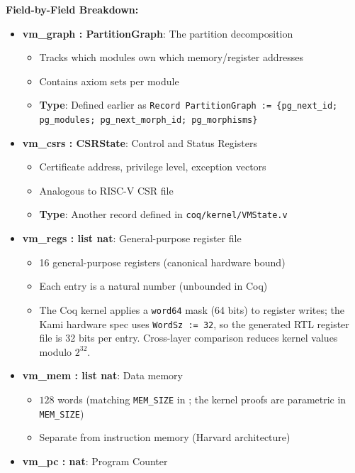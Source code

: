 \textbf{Field-by-Field Breakdown:}
\begin{itemize}
    \item \textbf{vm\_graph : PartitionGraph}: The partition decomposition
    \begin{itemize}
        \item Tracks which modules own which memory/register addresses
        \item Contains axiom sets per module
        \item \textbf{Type}: Defined earlier as \texttt{Record PartitionGraph := \{pg\_next\_id; pg\_modules; pg\_next\_morph\_id; pg\_morphisms\}}
    \end{itemize}
    \item \textbf{vm\_csrs : CSRState}: Control and Status Registers
    \begin{itemize}
        \item Certificate address, privilege level, exception vectors
        \item Analogous to RISC-V CSR file
        \item \textbf{Type}: Another record defined in \texttt{coq/kernel/VMState.v}
    \end{itemize}
    \item \textbf{vm\_regs : list nat}: General-purpose register file
    \begin{itemize}
        \item 16 general-purpose registers (canonical hardware bound)
        \item Each entry is a natural number (unbounded in Coq)
        \item The Coq kernel applies a \texttt{word64} mask (64 bits) to register writes; the Kami hardware spec uses \texttt{WordSz := 32}, so the generated RTL register file is 32 bits per entry. Cross-layer comparison reduces kernel values modulo $2^{32}$.
    \end{itemize}
    \item \textbf{vm\_mem : list nat}: Data memory
    \begin{itemize}
        \item $128$ words (matching \texttt{MEM\_SIZE} in ; the kernel proofs are parametric in \texttt{MEM\_SIZE})
        \item Separate from instruction memory (Harvard architecture)
    \end{itemize}
    \item \textbf{vm\_pc : nat}: Program Counter
    \begin{itemize}

\end{itemize}
\end{itemize}
